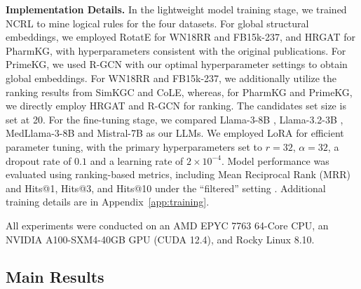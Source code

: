 \documentclass[11pt]{article}
\begin{document}
\noindent \textbf{Implementation Details.}
In the lightweight model training stage, we trained NCRL to mine logical rules for the four datasets. For global structural embeddings, we employed RotatE for WN18RR and FB15k-237, and HRGAT for PharmKG, with hyperparameters consistent with the original publications. For PrimeKG, we used R-GCN with our optimal hyperparameter settings to obtain global embeddings. For WN18RR and FB15k-237, we additionally utilize the ranking results from SimKGC and CoLE, whereas, for PharmKG and PrimeKG, we directly employ HRGAT and R-GCN for ranking. The candidates set size is set at 20. For the fine-tuning stage, we compared Llama-3-8B \citep{dubey2024llama}, Llama-3.2-3B \citep{dubey2024llama}, MedLlama-3-8B \citep{medllama3b} and Mistral-7B \citep{jiang2023mistral} as our LLMs. We employed LoRA for efficient parameter tuning, with the primary hyperparameters set to $r=32$, $\alpha=32$, a dropout rate of $0.1$ and a learning rate of $2 \times 10^{-4}$. Model performance was evaluated using ranking-based metrics, including Mean Reciprocal Rank (MRR) and Hits@1, Hits@3, and Hits@10 under the “filtered” setting \citep{bordes2013translating}.  Additional training details are in Appendix~\ref{app:training}.

All experiments were conducted on an AMD EPYC 7763 64-Core CPU, an NVIDIA A100-SXM4-40GB GPU (CUDA 12.4), and Rocky Linux 8.10. 


\subsection{Main Results}

\end{document}
